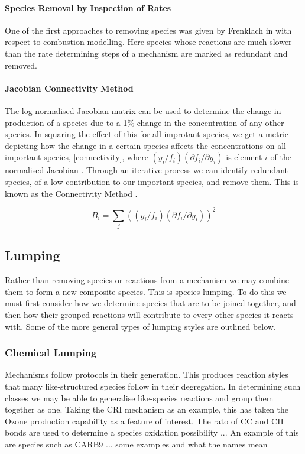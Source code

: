 \paragraph*{Species Removal by Inspection of Rates}
One of the first approaches to removing species was given by Frenklach in \cite{frenk} with respect to combustion modelling. Here species whose reactions are much slower than the rate determining steps of a mechanism are marked as redundant and removed. 

\paragraph*{Jacobian Connectivity Method}

The log-normalised Jacobian matrix can be used to determine the change in production of a species due to a 1\% change in the concentration of any other species. In squaring the effect of this for all improtant species, we get a metric depicting how the change in a certain species affects the concentrations on all important species, \autoref{connectivity}, where $({y_i}/{f_i})({\partial f_i}/{\partial y_i})$ is element $i$ of the normalised Jacobian . Through an iterative process we can identify redundant species, of a low contribution to our important species, and remove them. This is known as the Connectivity Method \cite{cm}.


\begin{equation}
B_i  = \sum_j(({y_i}/{f_i})({\partial f_i}/{\partial y_i}))^2 \label{connectivity}
\end{equation}

\subsection{Lumping}
Rather than removing species or reactions from a mechanism we may combine them to form a new composite species. This is species lumping. To do this we must first consider how we determine species that are to be joined together, and then how their grouped reactions will contribute to every other species it reacts with. Some of the more general types of lumping styles are outlined below. 


\subsubsection{Chemical Lumping}
Mechanisms follow protocols in their generation. This produces reaction styles that many like-structured species follow in their degregation. In determining such classes we may be able to generalise like-species reactions and group them together as one. Taking the CRI mechanism as an example, this has taken the Ozone production capability as a feature of interest. The rato of CC and CH bonds are used to determine a species oxidation possibility ... An example of this are species such as CARB9  ... some examples and what the names mean \\

